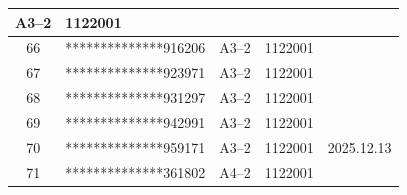 \documentclass[UTF8,10pt,a4paper,fontset=fandol]{ctexart}
\newcommand{\fieldvalue}[1]{#1}
\newcommand{\handwritten}[1]{#1}
\begin{document}
\begin{center}
\begin{tabular}{|c|p{4.2cm}|c|c|p{2.0cm}|}
\fieldvalue{A3--2} &
\fieldvalue{1122001} & \\ \hline
\fieldvalue{66} &
\fieldvalue{**************916206} &
\fieldvalue{A3--2} &
\fieldvalue{1122001} & \\ \hline
\fieldvalue{67} &
\fieldvalue{**************923971} &
\fieldvalue{A3--2} &
\fieldvalue{1122001} & \\ \hline
\fieldvalue{68} &
\fieldvalue{**************931297} &
\fieldvalue{A3--2} &
\fieldvalue{1122001} & \\ \hline
\fieldvalue{69} &
\fieldvalue{**************942991} &
\fieldvalue{A3--2} &
\fieldvalue{1122001} & \\ \hline
\fieldvalue{70} &
\fieldvalue{**************959171} &
\fieldvalue{A3--2} &
\fieldvalue{1122001} &
\fieldvalue{\handwritten{2025.12.13}}
\\ \hline
\fieldvalue{71} &
\fieldvalue{**************361802} &
\fieldvalue{A4--2} &
\fieldvalue{1122001} & \\ \hline

\end{tabular}
\end{center}
\end{document}

